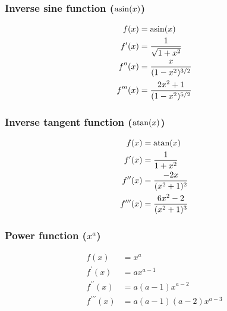 \documentclass[english]{../thermomemo/thermomemo}
\begin{document}
\subsubsection{Inverse sine function ($\asin(x)$)}
\begin{align}
  f(x) &= \asin(x) \\
  f^\prime(x) &= \frac{1}{\sqrt{1 + x^2}} \\
  f^{\prime\prime}(x) &= \frac{x}{(1 - x^2)^{3/2}}\\
  f^{\prime\prime\prime}(x) &= \frac{2 x^2 + 1}{(1 - x^2)^{5/2}}
\end{align}
\subsubsection{Inverse tangent function ($\atan(x)$)}
\begin{align}
  f(x) &= \atan(x) \\
  f^\prime(x) &= \frac{1}{1 + x^2} \\
  f^{\prime\prime}(x) &= \frac{-2 x}{(x^2 + 1)^2}\\
  f^{\prime\prime\prime}(x) &= \frac{6 x^2 - 2}{(x^2 + 1)^3}
\end{align}
\subsubsection{Power function ($x^a$)}
\begin{align}
  f(x) &= x^a \\
  f^\prime(x) &= a x^{a-1} \\
  f^{\prime\prime}(x) &= a (a-1)  x^{a-2} \\
  f^{\prime\prime\prime}(x) &= a (a-1) (a-2)  x^{a-3}
\end{align}

\clearpage


\end{document}

